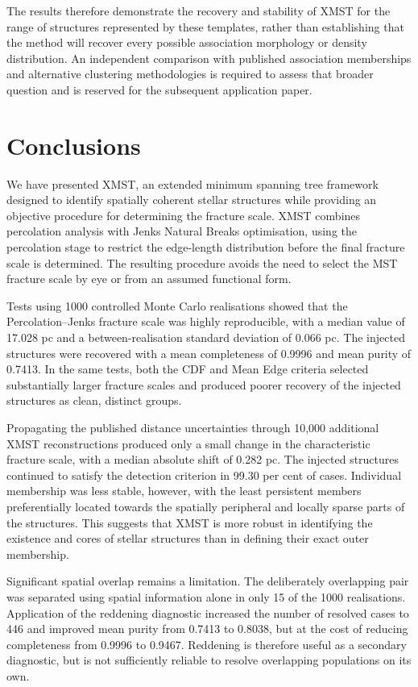 \documentclass[fleqn,usenatbib]{mnras}
\begin{document}
The results therefore demonstrate the recovery and stability of XMST for the range of structures represented by these templates, rather than establishing that the method will recover every possible association morphology or density distribution. An independent comparison with published association memberships and alternative clustering methodologies is required to assess that broader question and is reserved for the subsequent application paper.



\section{Conclusions}

We have presented XMST, an extended minimum spanning tree framework designed to identify spatially coherent stellar structures while providing an objective procedure for determining the fracture scale. XMST combines percolation analysis with Jenks Natural Breaks optimisation, using the percolation stage to restrict the edge-length distribution before the final fracture scale is determined. The resulting procedure avoids the need to select the MST fracture scale by eye or from an assumed functional form.

Tests using 1000 controlled Monte Carlo realisations showed that the Percolation–Jenks fracture scale was highly reproducible, with a median value of 17.028 pc and a between-realisation standard deviation of 0.066 pc. The injected structures were recovered with a mean completeness of 0.9996 and mean purity of 0.7413. In the same tests, both the CDF and Mean Edge criteria selected substantially larger fracture scales and produced poorer recovery of the injected structures as clean, distinct groups.

Propagating the published distance uncertainties through 10,000 additional XMST reconstructions produced only a small change in the characteristic fracture scale, with a median absolute shift of 0.282 pc. The injected structures continued to satisfy the detection criterion in 99.30 per cent of cases. Individual membership was less stable, however, with the least persistent members preferentially located towards the spatially peripheral and locally sparse parts of the structures. This suggests that XMST is more robust in identifying the existence and cores of stellar structures than in defining their exact outer membership.

Significant spatial overlap remains a limitation. The deliberately overlapping pair was separated using spatial information alone in only 15 of the 1000 realisations. Application of the reddening diagnostic increased the number of resolved cases to 446 and improved mean purity from 0.7413 to 0.8038, but at the cost of reducing completeness from 0.9996 to 0.9467. Reddening is therefore useful as a secondary diagnostic, but is not sufficiently reliable to resolve overlapping populations on its own.
\end{document}
